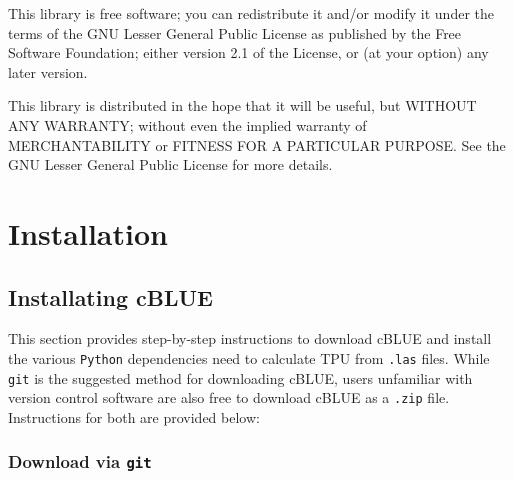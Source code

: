 \documentclass[11pt, a4paper]{article}
\begin{document}
        This library is free software; you can redistribute it and/or
        modify it under the terms of the GNU Lesser General Public
        License as published by the Free Software Foundation; either
        version 2.1 of the License, or (at your option) any later version.
        
\vspace{1em}

        This library is distributed in the hope that it will be useful,
        but WITHOUT ANY WARRANTY; without even the implied warranty of
        MERCHANTABILITY or FITNESS FOR A PARTICULAR PURPOSE.  See the GNU
        Lesser General Public License for more details.

\section{Installation}
\subsection{Installating cBLUE}
This section provides step-by-step instructions to download cBLUE and install the various \texttt{Python} dependencies need to calculate TPU from \texttt{.las} files. While \texttt{git} is the suggested method for downloading cBLUE, users unfamiliar with version control software are also free to download cBLUE as a \texttt{.zip} file. Instructions for both are provided below:

\subsubsection{Download via \texttt{git}}
\end{document}
